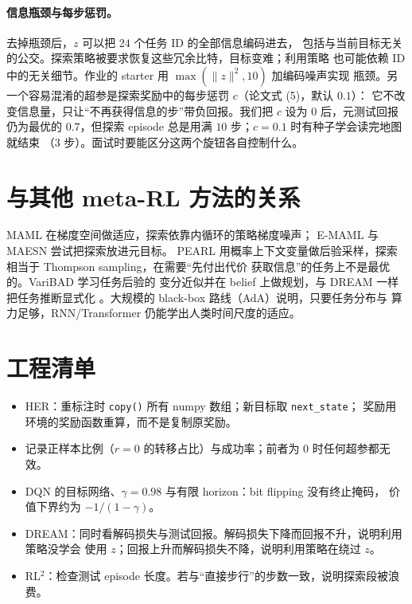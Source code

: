 \documentclass[10pt,twocolumn,a4paper]{ctexart}
\begin{document}
\paragraph{信息瓶颈与每步惩罚。}去掉瓶颈后，$z$ 可以把 $24$ 个任务 ID 的全部信息编码进去，
包括与当前目标无关的公交。探索策略被要求恢复这些冗余比特，目标变难；利用策略
也可能依赖 ID 中的无关细节。作业的 starter 用 $\max(\lVert z\rVert^2,10)$ 加编码噪声实现
瓶颈。另一个容易混淆的超参是探索奖励中的每步惩罚 $c$（论文式 (5)，默认 $0.1$）：
它不改变信息量，只让“不再获得信息的步”带负回报。我们把 $c$ 设为 $0$ 后，元测试回报
仍为最优的 $0.7$，但探索 episode 总是用满 $10$ 步；$c=0.1$ 时有种子学会读完地图就结束
（$3$ 步）。面试时要能区分这两个旋钮各自控制什么。

\section{与其他 meta-RL 方法的关系}
MAML 在梯度空间做适应，探索依靠内循环的策略梯度噪声\citep{finn2017maml}；
E-MAML 与 MAESN 尝试把探索放进元目标\citep{stadie2018ermaml,gupta2018maesn}。
PEARL 用概率上下文变量做后验采样，探索相当于 Thompson sampling，在需要“先付出代价
获取信息”的任务上不是最优的\citep{rakelly2019pearl}。VariBAD 学习任务后验的
变分近似并在 belief 上做规划，与 DREAM 一样把任务推断显式化
\citep{zintgraf2020varibad}。大规模的 black-box 路线（AdA）说明，只要任务分布与
算力足够，RNN/Transformer 仍能学出人类时间尺度的适应\citep{team2023ada}。

\section{工程清单}
\begin{itemize}
\item HER：重标注时 \texttt{copy()} 所有 numpy 数组；新目标取 \texttt{next\_state}；
奖励用环境的奖励函数重算，而不是复制原奖励。
\item 记录正样本比例（$r=0$ 的转移占比）与成功率；前者为 $0$ 时任何超参都无效。
\item DQN 的目标网络、$\gamma=0.98$ 与有限 horizon：bit flipping 没有终止掩码，
价值下界约为 $-1/(1-\gamma)$。
\item DREAM：同时看解码损失与测试回报。解码损失下降而回报不升，说明利用策略没学会
使用 $z$；回报上升而解码损失不降，说明利用策略在绕过 $z$。
\item RL$^2$：检查测试 episode 长度。若与“直接步行”的步数一致，说明探索段被浪费。
\end{itemize}
\end{document}
